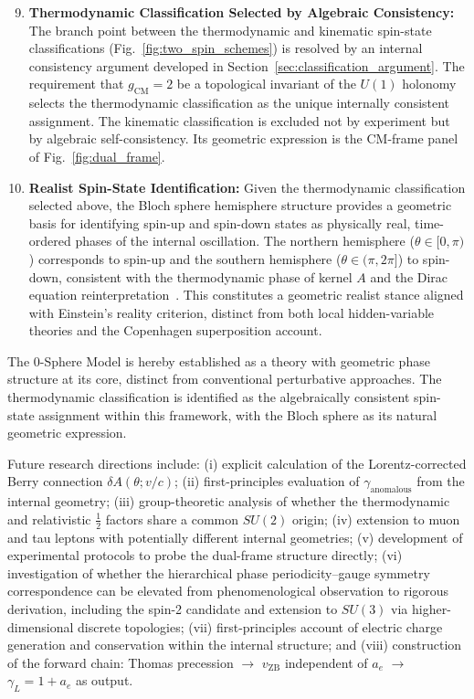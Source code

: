 \documentclass[%
 reprint,
 amsmath,amssymb,
 aps,
 prb,
]{revtex4-2}
\numberwithin{equation}{section}
\theoremstyle{definition}
\theoremstyle{remark}
\begin{document}
\begin{enumerate}
\setcounter{enumi}{8}
\item \textbf{Thermodynamic Classification Selected by Algebraic Consistency:} The branch point between the thermodynamic and kinematic spin-state classifications (Fig.~\ref{fig:two_spin_schemes}) is resolved by an internal consistency argument developed in Section~\ref{sec:classification_argument}. The requirement that $g_{\text{CM}} = 2$ be a topological invariant of the $U(1)$ holonomy selects the thermodynamic classification as the unique internally consistent assignment. The kinematic classification is excluded not by experiment but by algebraic self-consistency. Its geometric expression is the CM-frame panel of Fig.~\ref{fig:dual_frame}.

\item \textbf{Realist Spin-State Identification:} Given the thermodynamic classification selected above, the Bloch sphere hemisphere structure provides a geometric basis for identifying spin-up and spin-down states as physically real, time-ordered phases of the internal oscillation. The northern hemisphere ($\theta \in [0,\pi)$) corresponds to spin-up and the southern hemisphere ($\theta \in (\pi, 2\pi]$) to spin-down, consistent with the thermodynamic phase of kernel $A$ and the Dirac equation reinterpretation~\cite{Hanamura_2020_07}. This constitutes a geometric realist stance aligned with Einstein's reality criterion, distinct from both local hidden-variable theories and the Copenhagen superposition account.
\end{enumerate}

The 0-Sphere Model is hereby established as a theory with geometric phase structure at its core, distinct from conventional perturbative approaches. The thermodynamic classification is identified as the algebraically consistent spin-state assignment within this framework, with the Bloch sphere as its natural geometric expression.

Future research directions include: (i) explicit calculation of the Lorentz-corrected Berry connection $\delta A(\theta; v/c)$; (ii) first-principles evaluation of $\gamma_{\text{anomalous}}$ from the internal geometry; (iii) group-theoretic analysis of whether the thermodynamic and relativistic $\frac{1}{2}$ factors share a common $SU(2)$ origin; (iv) extension to muon and tau leptons with potentially different internal geometries; (v) development of experimental protocols to probe the dual-frame structure directly; (vi) investigation of whether the hierarchical phase periodicity--gauge symmetry correspondence can be elevated from phenomenological observation to rigorous derivation, including the spin-2 candidate and extension to $SU(3)$ via higher-dimensional discrete topologies; (vii) first-principles account of electric charge generation and conservation within the internal structure; and (viii) construction of the forward chain: Thomas precession $\to$ $v_{\text{ZB}}$ independent of $a_e$ $\to$ $\gamma_L = 1+a_e$ as output.
\end{document}
